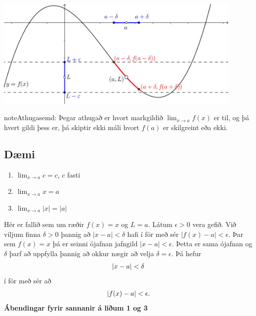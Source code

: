 \documentclass[b5paper,10pt,icelandic]{sphinxmanual}
\begin{document}
\begin{center}
\includegraphics[width=12cm,keepaspectratio=true]{01_markgildi.png}
\end{center}


\begin{notice}{note}{Athugasemd:}
Þegar athugað er hvort markgildið \(\lim_{x\rightarrow a} f(x)\) er
til, og þá hvert gildi þess er, þá skiptir ekki máli hvort \(f(a)\) er
skilgreint eða ekki.
\end{notice}


\subsection{Dæmi}
\label{kafli02:daemi2-1}\label{kafli02:daemi}\begin{enumerate}
\item {} 
\(\lim_{x \to a} c = c\), \(c\) fasti

\item {} 
\(\lim_{x \to a} x = a\)

\item {} 
\(\lim_{x \to a} |x| = |a|\)

\end{enumerate}

Hér er fallið sem um ræðir \(f(x) = x\) og \(L=a\).
Látum \(\epsilon>0\) vera gefið. Við viljum finna
\(\delta >0\) þannig að \(|x-a|<\delta\) hafi í för
með sér \(|f(x)-a| < \epsilon\). Þar sem \(f(x)=x\) þá er seinni
ójafnan jafngild \(|x-a|<\epsilon\). Þetta er sama ójafnan og
\(\delta\) þarf að uppfylla þannig að okkur nægir að velja
\(\delta = \epsilon\). Þá hefur
\begin{gather}
\begin{split}|x-a| < \delta\end{split}\notag
\end{gather}
í för með sér að
\begin{gather}
\begin{split}|f(x) -a| < \epsilon.\end{split}\notag
\end{gather}
\textbf{Ábendingar fyrir sannanir á liðum 1 og 3}
\end{document}

